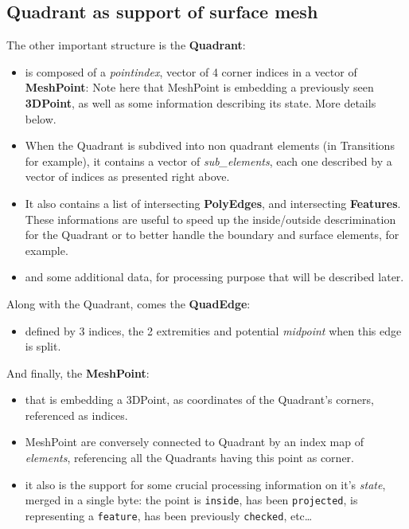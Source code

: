 \documentclass[10pt]{article}
\begin{document}
\subsection{Quadrant as support of surface mesh}

The other important structure is the \textbf{Quadrant}:
\begin{itemize}
\item is composed of a \textit{pointindex}, vector of 4 corner indices in a vector of \textbf{MeshPoint}: Note here that MeshPoint is embedding a previously seen \textbf{3DPoint}, as well as some information describing its state. More details below.
\item When the Quadrant is subdived into non quadrant elements (in Transitions for example), it contains a vector of \textit{sub\_elements}, each one described by a vector of indices as presented right above.
\item It also contains a list of intersecting \textbf{PolyEdges}, and intersecting \textbf{Features}. These informations are useful to speed up the inside/outside descrimination for the Quadrant or to better handle the boundary and surface elements, for example.
\item and some additional data, for processing purpose that will be described later.
\end{itemize}

Along with the Quadrant, comes the \textbf{QuadEdge}:
\begin{itemize}
\item defined by 3 indices, the 2 extremities and potential \textit{midpoint} when this edge is split.
\end{itemize}

And finally, the \textbf{MeshPoint}:
\begin{itemize}
\item that is embedding a 3DPoint, as coordinates of the Quadrant's corners, referenced as indices.
\item MeshPoint are conversely connected to Quadrant by an index map of \textit{elements}, referencing all the Quadrants having this point as corner.
\item it also is the support for some crucial processing information on it's \textit{state}, merged in a single byte: the point is \verb?inside?, has been \verb?projected?, is representing a \verb?feature?, has been previously \verb?checked?, etc\ldots  
\end{itemize}
\end{document}
